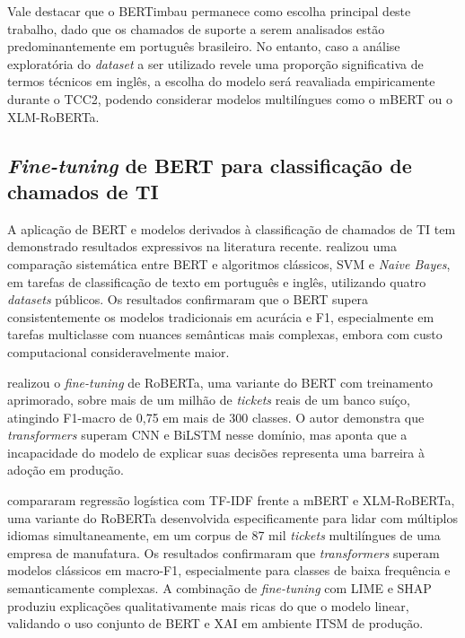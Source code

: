 \documentclass[
    12pt,                %
    openright,           %
    oneside,             %
    a4paper,             %
    english,             %
    brazil               %
]{abntex2}
\begin{document}
Vale destacar que o BERTimbau permanece como escolha principal 
deste trabalho, dado que os chamados de suporte a serem analisados 
estão predominantemente em português brasileiro. No entanto, caso a 
análise exploratória do \textit{dataset} a ser utilizado revele 
uma proporção significativa de termos técnicos em inglês, a escolha 
do modelo será reavaliada empiricamente durante o TCC2, podendo 
considerar modelos multilíngues como o mBERT ou o XLM-RoBERTa.

\subsection{\textit{Fine-tuning} de BERT para classificação de chamados de TI}
\label{subsec:bert_tickets}

A aplicação de BERT e modelos derivados à classificação de chamados de TI tem demonstrado resultados expressivos na literatura recente.  realizou uma comparação sistemática entre BERT e algoritmos clássicos, SVM e \textit{Naive Bayes}, em tarefas de classificação de texto em português e inglês, utilizando quatro \textit{datasets} públicos. Os resultados confirmaram que o BERT supera consistentemente os modelos tradicionais em acurácia e F1, especialmente em tarefas multiclasse com nuances semânticas mais complexas, embora com custo computacional consideravelmente maior.

 realizou o \textit{fine-tuning} de RoBERTa, 
uma variante do BERT com treinamento aprimorado, sobre mais de um 
milhão de \textit{tickets} reais de um banco suíço, atingindo 
F1-macro de 0,75 em mais de 300 classes. O autor demonstra que 
\textit{transformers} superam CNN e BiLSTM nesse domínio, mas aponta 
que a incapacidade do modelo de explicar suas decisões representa 
uma barreira à adoção em produção.

 compararam regressão logística com TF-IDF 
frente a mBERT e XLM-RoBERTa, uma variante do RoBERTa desenvolvida 
especificamente para lidar com múltiplos idiomas simultaneamente, 
em um corpus de 87 mil \textit{tickets} multilíngues de uma empresa 
de manufatura. Os resultados confirmaram que \textit{transformers} 
superam modelos clássicos em macro-F1, especialmente para classes 
de baixa frequência e semanticamente complexas. A combinação de 
\textit{fine-tuning} com LIME e SHAP produziu explicações 
qualitativamente mais ricas do que o modelo linear, validando o 
uso conjunto de BERT e XAI em ambiente ITSM de produção.
\end{document}
